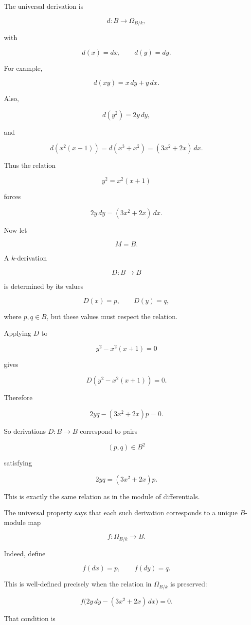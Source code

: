 \documentclass[12pt,a4paper]{article}
\theoremstyle{notespace}
\begin{document}
The universal derivation is

\[
d:B\to \Omega_{B/k},
\]

with

\[
d(x)=dx,
\qquad
d(y)=dy.
\]

For example,

\[
d(xy)=x\,dy+y\,dx.
\]

Also,

\[
d(y^2)=2y\,dy,
\]

and

\[
d(x^2(x+1))=d(x^3+x^2)=(3x^2+2x)\,dx.
\]

Thus the relation

\[
y^2=x^2(x+1)
\]

forces

\[
2y\,dy=(3x^2+2x)\,dx.
\]

Now let

\[
M=B.
\]

A \(k\)-derivation

\[
D:B\to B
\]

is determined by its values

\[
D(x)=p,
\qquad
D(y)=q,
\]

where \(p,q\in B\), but these values must respect the relation.

Applying \(D\) to

\[
y^2-x^2(x+1)=0
\]

gives

\[
D(y^2-x^2(x+1))=0.
\]

Therefore

\[
2yq-(3x^2+2x)p=0.
\]

So derivations \(D:B\to B\) correspond to pairs

\[
(p,q)\in B^2
\]

satisfying

\[
2yq=(3x^2+2x)p.
\]

This is exactly the same relation as in the module of differentials.

The universal property says that each such derivation corresponds to a unique \(B\)-module map

\[
f:\Omega_{B/k}\to B.
\]

Indeed, define

\[
f(dx)=p,
\qquad
f(dy)=q.
\]

This is well-defined precisely when the relation in \(\Omega_{B/k}\) is preserved:

\[
f\bigl(2y\,dy-(3x^2+2x)\,dx\bigr)=0.
\]

That condition is
\end{document}
